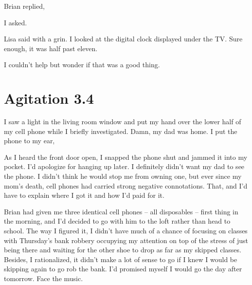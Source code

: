  Brian replied, 

 I asked.



 Lisa said with a grin. I looked at the digital clock displayed under the TV. Sure enough, it was half past eleven.

I couldn't help but wonder if that was a good thing.


\chapter{Agitation 3.4}

 I saw a light in the living room window and put my hand over the lower half of my cell phone while I briefly investigated. Damn, my dad was home. I put the phone to my ear, 

As I heard the front door open, I snapped the phone shut and jammed it into my pocket. I'd apologize for hanging up later. I definitely didn't want my dad to see the phone. I didn't think he would stop me from owning one, but ever since my mom's death, cell phones had carried strong negative connotations. That, and I'd have to explain where I got it and how I'd paid for it.

Brian had given me three identical cell phones -- all disposables -- first thing in the morning, and I'd decided to go with him to the loft rather than head to school. The way I figured it, I didn't have much of a chance of focusing on classes with Thursday's bank robbery occupying my attention on top of the stress of just being there and waiting for the other shoe to drop as far as my skipped classes. Besides, I rationalized, it didn't make a lot of sense to go if I knew I would be skipping again to go rob the bank. I'd promised myself I would go the day after tomorrow. Face the music.

